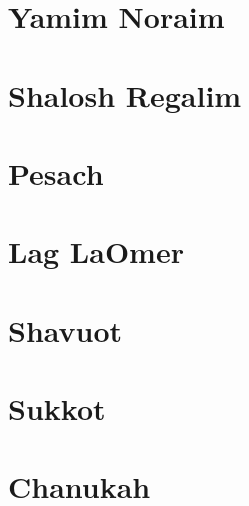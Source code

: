 \documentclass[letterpaper]{memoir}
\newcommand{\song}[2]{}
\begin{document}
\chapter{Yamim Noraim}
\song{Lecha Eli}{Lecha_Eli.pdf}

\chapter{Shalosh Regalim}
\song{Mauzi}{Mauzi.pdf}
\song{Samachti Tehillim 122}{Samachti.pdf}
\song{B'tzeit Yisrael}{Btzeit_Yisrael.pdf}
\song{Aromimcha}{Aromimcha.pdf}

\chapter{Pesach}
\song{Yachid Norah}{Yachid_Norah.pdf}
\song{Rachum Atah}{Rachum_Atah.pdf}
\song{B'neh Li Zevul Mishkani}{Bneh_Li_Zevul_Mishkani.pdf}
\song{Emunim Irchu Shevach (Yerushalmi)}{Emunim_Irchu_Shevach_Yerushalyim.pdf}
\song{Emunim Irchu Shevach (Syrian)}{Emunim_Irchu_Shevach_Syrian.pdf}
\song{Mi Yimalel Gevurotecha}{Mi_Yimalel_Gevurotecha.pdf}
\song{El B'Yado}{El_BYado.pdf}
\song{El B'Yado \#2}{El_BYado_2.pdf}
\song{El Maleh HaNechsar}{El_Maleh_HaNechsar.pdf}
\song{Ashir laEl Ga'oh Ga'ah}{Ashir_laEl_Gaoh_Gaah.pdf}

\chapter{Lag LaOmer}
\song{V'amartem Ko Lachai}{Vamartem_Ko_Lachai.pdf}

\chapter{Shavuot}
\song{Roe' Ne'eman Hu}{Roe_Neeman_Hu.pdf}
\song{Da'at Umzimah}{Daat_Umzimah.pdf}

\chapter{Sukkot}
\song{Sukkah v'Lulav (Moroccan)}{Sukkah_vLulav_Moroccan.pdf}
\song{Sukkah v'Lulav (Yerushalmi)}{Sukkah_vLulav_Yerushalmi.pdf}
\song{Sukkah v'Lulav (Iraqi)}{Sukkah_vLulav_Iraqi.pdf}
\song{Chanun Rachem}{Chanun_Rachem.pdf}
\song{Yah Et Sukkat David Takim}{Yah_Et_Sukkat_David_Takim.pdf}
\song{Nizke l'kol Berachot (Iraqi)}{Nizke_lkol_Berachot_Bavel.pdf}
\song{Nizke l'kol Berachot}{Nizke_lkol_Berachot.pdf}

\chapter{Chanukah}
\song{Yah Hatzel Yonah}{Yah_Hatzel_Yonah.pdf}
\song{Heichalo Heichalo}{Heichalo_Heichalo.pdf}
\song{L'neri}{Lneri.pdf}
\song{Am Ne'emanai}{Am_Neemanai.pdf}
\song{Hanerot Halalu}{Hanerot_Halalu.pdf}
\end{document}
